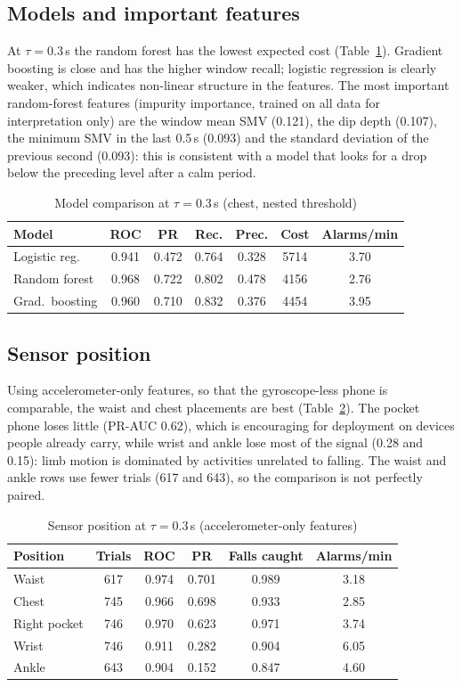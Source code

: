 \documentclass[conference]{IEEEtran}
\begin{document}
\subsection{Models and important features}
At $\tau=0.3$\,s the random forest has the lowest expected cost (Table~\ref{tab:models}). Gradient boosting is close and has the higher window recall; logistic regression is clearly weaker, which indicates non-linear structure in the features. The most important random-forest features (impurity importance, trained on all data for interpretation only) are the window mean SMV (0.121), the dip depth (0.107), the minimum SMV in the last 0.5\,s (0.093) and the standard deviation of the previous second (0.093): this is consistent with a model that looks for a drop below the preceding level after a calm period.

\begin{table}[t]
\caption{Model comparison at $\tau=0.3$\,s (chest, nested threshold)}
\label{tab:models}
\centering
\footnotesize
\begin{tabular}{@{}lcccccc@{}}
\toprule
Model & ROC & PR & Rec. & Prec. & Cost & Alarms/min \\
\midrule
Logistic reg. & 0.941 & 0.472 & 0.764 & 0.328 & 5714 & 3.70 \\
Random forest & 0.968 & 0.722 & 0.802 & 0.478 & 4156 & 2.76 \\
Grad.\ boosting & 0.960 & 0.710 & 0.832 & 0.376 & 4454 & 3.95 \\
\bottomrule
\end{tabular}
\end{table}

\subsection{Sensor position}
Using accelerometer-only features, so that the gyroscope-less phone is comparable, the waist and chest placements are best (Table~\ref{tab:pos}). The pocket phone loses little (PR-AUC 0.62), which is encouraging for deployment on devices people already carry, while wrist and ankle lose most of the signal (0.28 and 0.15): limb motion is dominated by activities unrelated to falling. The waist and ankle rows use fewer trials (617 and 643), so the comparison is not perfectly paired.

\begin{table}[t]
\caption{Sensor position at $\tau=0.3$\,s (accelerometer-only features)}
\label{tab:pos}
\centering
\footnotesize
\begin{tabular}{@{}lccccc@{}}
\toprule
Position & Trials & ROC & PR & Falls caught & Alarms/min \\
\midrule
Waist & 617 & 0.974 & 0.701 & 0.989 & 3.18 \\
Chest & 745 & 0.966 & 0.698 & 0.933 & 2.85 \\
Right pocket & 746 & 0.970 & 0.623 & 0.971 & 3.74 \\
Wrist & 746 & 0.911 & 0.282 & 0.904 & 6.05 \\
Ankle & 643 & 0.904 & 0.152 & 0.847 & 4.60 \\
\bottomrule
\end{tabular}
\end{table}
\end{document}

